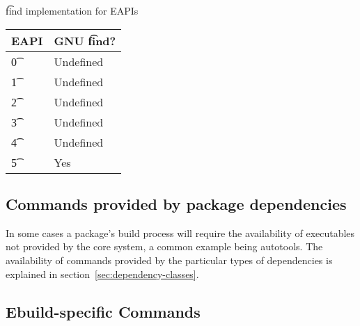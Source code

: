 \begin{centertable}{\t{find} implementation for EAPIs} \label{tab:system-commands-table}
    \begin{tabular}{ l l }
        \toprule
            \multicolumn{1}{c}{\textbf{EAPI}} &
            \multicolumn{1}{c}{\textbf{GNU \t{find}?}} \\
            \midrule
    \t{0} & Undefined \\
    \t{1} & Undefined \\
    \t{2} & Undefined \\
    \t{3} & Undefined \\
    \t{4} & Undefined \\
    \t{5} & Yes \\
    \bottomrule
    \end{tabular}
\end{centertable}

\subsection{Commands provided by package dependencies}

In some cases a package's build process will require the availability of executables not provided by
the core system, a common example being autotools. The availability of commands provided by the
particular types of dependencies is explained in section~\ref{sec:dependency-classes}.

\subsection{Ebuild-specific Commands}



